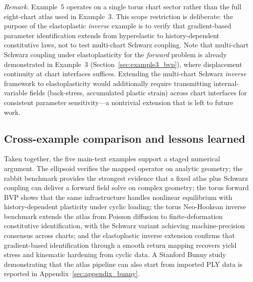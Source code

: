 \documentclass[sort&compress]{svjour3} %
\begin{document}
\emph{Remark.} Example~5 operates on a single torus chart sector rather than the full eight-chart atlas used in Example~3. This scope restriction is deliberate: the purpose of the elastoplastic \emph{inverse} example is to verify that gradient-based parameter identification extends from hyperelastic to history-dependent constitutive laws, not to test multi-chart Schwarz coupling. Note that multi-chart Schwarz coupling under elastoplasticity for the \emph{forward} problem is already demonstrated in Example~3 (Section~\ref{sec:example3_bvp}), where displacement continuity at chart interfaces suffices. Extending the multi-chart Schwarz \emph{inverse} framework to elastoplasticity would additionally require transmitting internal-variable fields (back-stress, accumulated plastic strain) across chart interfaces for consistent parameter sensitivity---a nontrivial extension that is left to future work.

\subsection{Cross-example comparison and lessons learned}
Taken together, the five main-text examples support a staged numerical argument. The ellipsoid verifies the mapped operator on analytic geometry; the rabbit benchmark provides the strongest evidence that a fixed atlas plus Schwarz coupling can deliver a forward field solve on complex geometry; the torus forward BVP shows that the same infrastructure handles nonlinear equilibrium with history-dependent plasticity under cyclic loading; the torus Neo-Hookean inverse benchmark extends the atlas from Poisson diffusion to finite-deformation constitutive identification, with the Schwarz variant achieving machine-precision consensus across charts; and the elastoplastic inverse extension confirms that gradient-based identification through a smooth return mapping recovers yield stress and kinematic hardening from cyclic data. A Stanford Bunny study demonstrating that the atlas pipeline can also start from imported PLY data is reported in Appendix~\ref{sec:appendix_bunny}.
\end{document}
